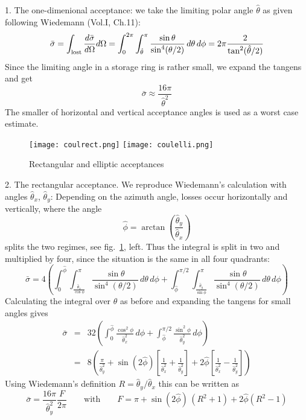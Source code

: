 \documentclass[12pt]{article}
\newcommand\beq{\begin{equation}}
\newcommand\eeq{\end{equation}}
\begin{document}
1. The one-dimenional acceptance: we take the limiting polar angle $\hat{\theta}$ as given following Wiedemann \cite{wiedemann} (Vol.I, Ch.11):
\beq\label{intd1}
\bar\sigma = \int_{\rm lost} \frac{d\bar\sigma}{d\Omega} d\Omega =
\int_0^{2\pi} \int_{\hat{\theta}}^{\pi} \frac{\sin\theta}{\sin^4(\theta/2)} \, d\theta \, d\phi = 2\pi \frac{2}{\tan^2(\hat{\theta}/2)}
\eeq
Since the limiting angle in a storage ring is rather small, we expand the tangens and get
\beq
\bar\sigma \approx \frac{16 \pi}{\hat{\theta}^2}
\eeq
The smaller of horizontal and vertical acceptance angles is used as a worst case estimate.

\begin{figure}[thb]
\centering
\texttt{[image: coulrect.png]}
\texttt{[image: coulelli.png]}
\caption{\label{cfig}Rectangular and elliptic acceptances}
\end{figure}

2. The rectangular acceptance. We reproduce Wiedemann's calculation with angles $\hat{\theta}_x$, $\hat{\theta}_y$:
Depending on the azimuth angle, losses occur horizontally and vertically, where the angle
\beq
\hat{\phi}=\arctan\left( \frac{\hat{\theta}_y}{\hat{\theta}_x}\right)
\eeq
 splits the two regimes, see fig.~\ref{cfig}, left. Thus the integral is split in two and multiplied by four, since the situation is the same in all four quadrants:
\beq
\bar\sigma = 4 \left( \int_0^{\hat\phi} \int_{\frac{\hat\theta_x}{\cos\phi}}^{\pi} \frac{\sin\theta}{\sin^4(\theta/2)}\, d\theta\, d\phi + \int_{\hat\phi}^{\pi/2} \int_{\frac{\hat \theta_y}{\sin\phi}}^{\pi} \frac{\sin\theta}{\sin^4(\theta/2)}\, d\theta\, d\phi \right)
\eeq
Calculating the integral over $\theta$ as before and expanding the tangens for small angles gives
\begin{eqnarray}
\bar\sigma & = &  32 \left( \int_0^{\hat\phi} \frac{\cos^2\phi}{\hat\theta_x^2}\, d\phi + \int_{\hat\phi}^{\pi/2}  \frac{\sin^2\phi}{\hat\theta_y^2}\, d\phi \right) \\
& = & 8 \left(\frac{\pi}{\hat\theta_y^2} +\sin(2 \hat\phi) \left[ \frac{1}{\hat\theta_x^2}+ \frac{1}{\hat\theta_y^2} \right]  +2\hat\phi \left[ \frac{1}{\hat\theta_x^2}- \frac{1}{\hat\theta_y^2} \right] \right)
\end{eqnarray}
Using Wiedemann's definition $R=\hat\theta_y/\hat\theta_x$ this can be written as
\beq
\bar\sigma = \frac{16 \pi}{\hat\theta_y^2} \frac{F}{2\pi}\qquad \mbox{with}\qquad
F = \pi+\sin(2\hat\phi)\, (R^2+1) + 2\hat\phi (R^2-1)
\eeq
\end{document}
